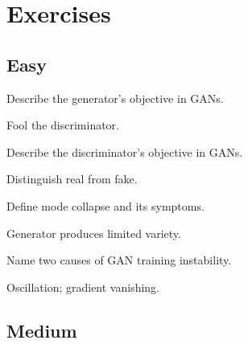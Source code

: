 
\section*{Exercises}

\subsection*{Easy}

\begin{exercisebox}[easy]
\begin{problem}
Describe the generator's objective in GANs.
\end{problem}
\begin{hintbox}
Fool the discriminator.
\end{hintbox}
\end{exercisebox}


\begin{exercisebox}[easy]
\begin{problem}
Describe the discriminator's objective in GANs.
\end{problem}
\begin{hintbox}
Distinguish real from fake.
\end{hintbox}
\end{exercisebox}


\begin{exercisebox}[easy]
\begin{problem}
Define mode collapse and its symptoms.
\end{problem}
\begin{hintbox}
Generator produces limited variety.
\end{hintbox}
\end{exercisebox}


\begin{exercisebox}[easy]
\begin{problem}
Name two causes of GAN training instability.
\end{problem}
\begin{hintbox}
Oscillation; gradient vanishing.
\end{hintbox}
\end{exercisebox}


\subsection*{Medium}

